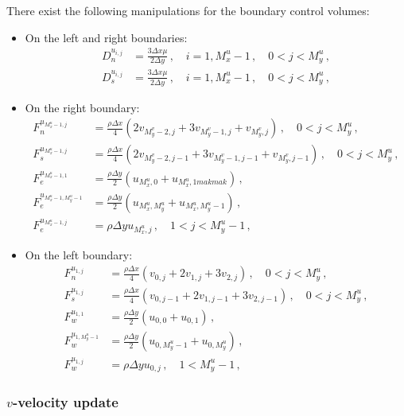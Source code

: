 \documentclass{article}
\begin{document}
There exist the following manipulations for the boundary control volumes:
\begin{itemize}
	\item On the left and right boundaries:
	\begin{align}
		D_n^{u_{i,j}} & = \frac{3 \Delta x \mu}{2 \Delta y}\,, \quad i = 1, M_x^u - 1\,, \quad 0 < j < M_y^u\,, \\
		D_s^{u_{i,j}} & = \frac{3 \Delta x \mu}{2 \Delta y}\,, \quad i = 1, M_x^u - 1\,, \quad 0 < j < M_y^u\,,
	\end{align}
	\item On the right boundary:
	\begin{align}
		F_n^{u_{M_x^u - 1, j}} & = \frac{\rho \Delta x}{4} \left( 2 v_{M_y^v - 2, j} + 3 v_{M_y^v - 1, j} + v_{M_y^v, j} \right)\,,\quad 0 < j < M_y^u\,,\\
		F_s^{u_{M_x^u - 1, j}} & = \frac{\rho \Delta x}{4} \left( 2 v_{M_y^v - 2, j-1} + 3 v_{M_y^v - 1, j-1} + v_{M_y^v, j-1} \right)\,,\quad 0 < j < M_y^u\,,\\
		F_e^{u_{M_x^u - 1, 1}} & = \frac{\rho \Delta y}{2} \left( u_{M_x^u, 0} + u_{M_x^u, 1makmak} \right)\,,\\
		F_e^{u_{M_x^u - 1, M_y^u - 1}} & = \frac{\rho \Delta y}{2} \left( u_{M_x^u, M_y^u} + u_{M_x^u, M_y^u - 1} \right)\,,\\
		F_e^{u_{M_x^u - 1, j}} & = \rho \Delta y u_{M_x^u, j}\,, \quad 1 < j < M_y^u - 1\,,
	\end{align}
	\item On the left boundary:
	\begin{align}
		F_n^{u_{1, j}} & = \frac{\rho \Delta x}{4} \left( v_{0, j} + 2 v_{1, j} + 3 v_{2, j} \right)\,,\quad 0 < j < M_y^u\,,\\
		F_s^{u_{1, j}} & = \frac{\rho \Delta x}{4} \left( v_{0, j-1} + 2 v_{1, j-1} + 3 v_{2, j-1} \right)\,,\quad 0 < j < M_y^u\,,\\
		F_w^{u_{1, 1}} & = \frac{\rho \Delta y}{2} \left( u_{0, 0} + u_{0, 1} \right)\,,\\
		F_w^{u_{1, M_y^u - 1}} & = \frac{\rho \Delta y}{2} \left( u_{0, M_y^u - 1} + u_{0, M_y^u} \right)\,,\\
		F_w^{u_{1, j}} & = \rho \Delta y u_{0, j}\,, \quad 1 < M_y^u - 1 \,,
	\end{align}
\end{itemize}
\subsubsection*{$v$-velocity update}
\end{document}
